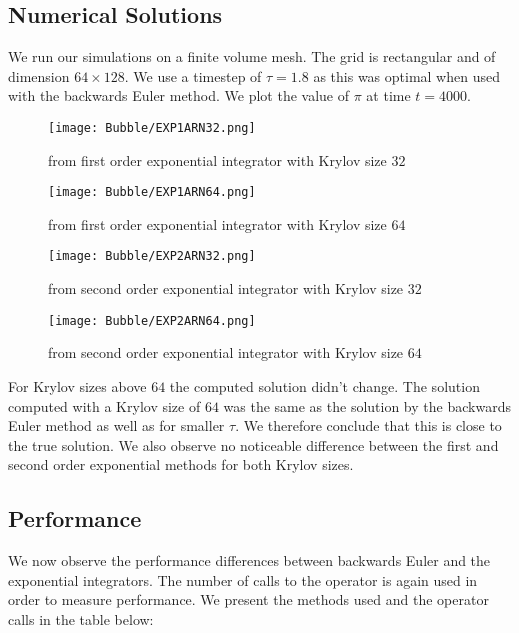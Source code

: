 \subsection{Numerical Solutions}
We run our simulations on a finite volume mesh.
The grid is rectangular and of dimension $64\times 128$.
We use a timestep of $\tau = 1.8$ as this was optimal when used with the backwards Euler method.
We plot the value of $\pi$ at time $t=4000$.
\begin{figure}[H]
    \centering
    \begin{minipage}{0.49\textwidth}
        \texttt{[image: Bubble/EXP1ARN32.png]} %
        \caption{from first order exponential integrator with Krylov size $32$}
        \label{fig:first order 8 0.5}
    \end{minipage}\hfill
    \centering
    \begin{minipage}{0.49\textwidth}
        \texttt{[image: Bubble/EXP1ARN64.png]} %
        \caption{from first order exponential integrator with Krylov size $64$}
        \label{fig:first order 10 0.5}
    \end{minipage}\hfill
\end{figure}
\begin{figure}[H]
    \centering
    \begin{minipage}{0.49\textwidth}
        \texttt{[image: Bubble/EXP2ARN32.png]} %
        \caption{from second order exponential integrator with Krylov size $32$}
        \label{fig:first order 8 0.5}
    \end{minipage}\hfill
    \centering
    \begin{minipage}{0.49\textwidth}
        \texttt{[image: Bubble/EXP2ARN64.png]} %
        \caption{from second order exponential integrator with Krylov size $64$}
        \label{fig:first order 10 0.5}
    \end{minipage}\hfill
\end{figure}
For Krylov sizes above $64$ the computed solution didn't change.
The solution computed with a Krylov size of $64$ was the same as the solution by the backwards Euler method as well as for smaller $\tau$.
We therefore conclude that this is close to the true solution.
We also observe no noticeable difference between the first and second order exponential methods for both Krylov sizes.

\subsection{Performance}
We now observe the performance differences between backwards Euler and the exponential integrators.
The number of calls to the operator is again used in order to measure performance.
We present the methods used and the operator calls in the table below:

